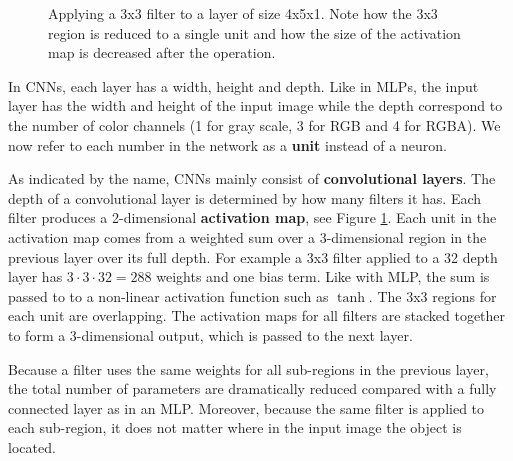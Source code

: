 \begin{figure}
\centering


\caption{Applying a 3x3 filter to a layer of size 4x5x1. Note how the 3x3 region is reduced to a single unit and how the size of the activation map is decreased after the operation.}
\label{fig:filter}
\end{figure}


In CNNs, each layer has a width, height and depth. Like in MLPs, the input layer has the width and height of the input image while the depth correspond to the number of color channels (1 for gray scale, 3 for RGB and 4 for RGBA). We now refer to each number in the network as a \textbf{unit} instead of a neuron.

As indicated by the name, CNNs mainly consist of \textbf{convolutional layers}. The depth of a convolutional layer is determined by how many filters it has. Each filter produces a 2-dimensional \textbf{activation map}, see Figure \ref{fig:filter}. Each unit in the activation map comes from a weighted sum over a 3-dimensional region in the previous layer over its full depth. For example a 3x3 filter applied to a 32 depth layer has $3 \cdot 3 \cdot 32=288$ weights and one bias term.
Like with MLP, the sum is passed to to a non-linear activation function such as $\tanh$. The 3x3 regions for each unit are overlapping.
The activation maps for all filters are stacked together to form a 3-dimensional output, which is passed to the next layer.

Because a filter uses the same weights for all sub-regions in the previous layer, the total number of parameters are dramatically reduced compared with a fully connected layer as in an MLP. Moreover, because the same filter is applied to each sub-region, it does not matter where in the input image the object is located.

